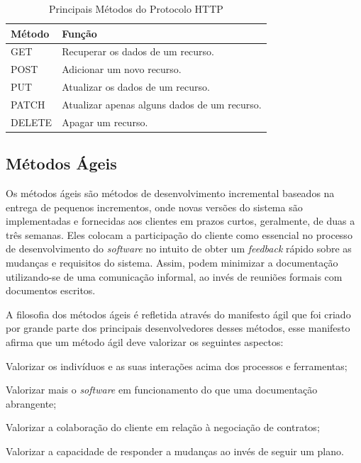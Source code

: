 {\renewcommand{\arraystretch}{2}
\begin{table}[H]
\centering
\caption{Principais Métodos do Protocolo HTTP}
\label{tab:metodos-http}
\begin{tabular}{ l | p{13.5cm} }
\hline
\textbf{Método} & \textbf{Função} \\
\hline
GET & Recuperar os dados de um recurso. \\ \hline
POST & Adicionar um novo recurso. \\ \hline
PUT & Atualizar os dados de um recurso. \\ \hline
PATCH & Atualizar apenas alguns dados de um recurso. \\ \hline
DELETE & Apagar um recurso. \\ \hline
\end{tabular}
\end{table}

\subsection{Métodos Ágeis}

Os métodos ágeis são métodos de desenvolvimento incremental baseados na entrega de pequenos incrementos, onde novas versões do sistema são implementadas e fornecidas aos clientes em prazos curtos, geralmente, de duas a três semanas. Eles colocam a participação do cliente como essencial no processo de desenvolvimento do \textit{software} no intuito de obter um \textit{feedback} rápido sobre as mudanças e requisitos do sistema. Assim, podem minimizar a documentação utilizando-se de uma comunicação informal, ao invés de reuniões formais com documentos escritos. \cite{sommerville}

A filosofia dos métodos ágeis é refletida através  do manifesto ágil que foi criado por grande parte dos principais desenvolvedores desses métodos, esse manifesto afirma que um método ágil deve valorizar os seguintes aspectos:

\begin{lista}
\item Valorizar os indivíduos e as suas interações acima dos processos e ferramentas;
\item Valorizar mais o \textit{software} em funcionamento do que uma documentação abrangente;
\item Valorizar a colaboração do cliente em relação à negociação de contratos;
\item Valorizar a capacidade de responder a mudanças ao invés de seguir um plano.
\end{lista}

}
